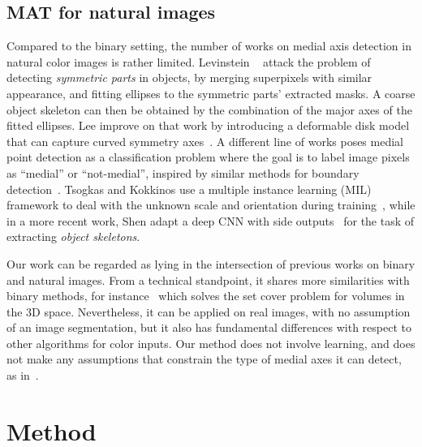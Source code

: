 \documentclass[10pt,twocolumn,letterpaper]{article}
\begin{document}
\subsection{MAT for natural images}
Compared to the binary setting, the number of works on medial axis detection in natural color images is rather limited.
Levinstein \etal~\cite{levinshtein2009multiscale} attack the problem of detecting \emph{symmetric parts} in objects,
by merging superpixels with similar appearance, and fitting ellipses to the symmetric parts' extracted masks.
A coarse object skeleton can then be obtained by the combination of the major axes of the fitted ellipses.
Lee \etal improve on that work by introducing a deformable disk model that can capture curved symmetry axes~\cite{lee2013detecting}.
A different line of works poses medial point detection as a classification problem where the goal is to label image pixels
as ``medial'' or ``not-medial'', inspired by similar methods for boundary detection~\cite{martin2004learning,arbelaez2011contour}.
Tsogkas and Kokkinos use a multiple instance learning (MIL) framework to deal with the unknown scale and orientation 
during training~\cite{tsogkas2012learning}, while in a more recent work, Shen \etal adapt a deep CNN with 
side outputs~\cite{xie2015holistically} for the task of extracting \emph{object skeletons}.

Our work can be regarded as lying in the intersection of previous works on binary and natural images.
From a technical standpoint, it shares more similarities with binary methods, for instance~\cite{stolpner2012medial}
which solves the set cover problem for volumes in the 3D space.
Nevertheless, it can be applied on real images, with no assumption of an image segmentation,
but it also has fundamental differences with respect to other algorithms for color inputs.
Our method does not involve learning, and does not make any assumptions that constrain the type of medial axes it can detect,
as in~\cite{tsogkas2012learning,shen2016object}.


\section{Method}\label{sec:method}
\end{document}
